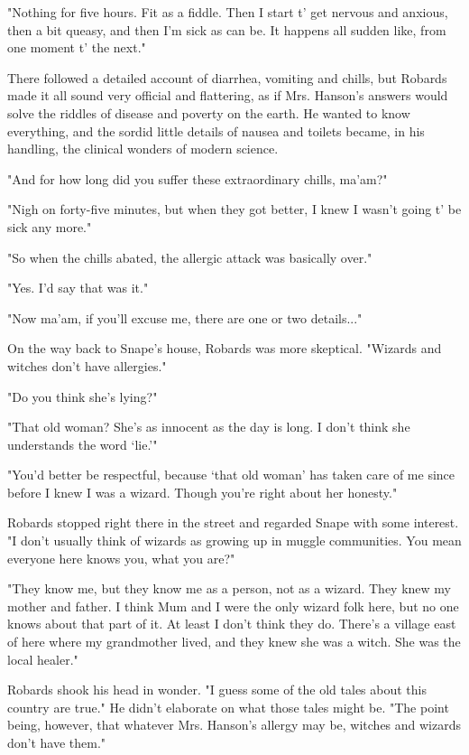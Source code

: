\documentclass[a4paper,11pt]{article}
\begin{document}
"Nothing for five hours. Fit as a fiddle. Then I start t' get nervous and anxious, then a bit queasy, and then I'm sick as can be. It happens all sudden like, from one moment t' the next."

There followed a detailed account of diarrhea, vomiting and chills, but Robards made it all sound very official and flattering, as if Mrs. Hanson's answers would solve the riddles of disease and poverty on the earth. He wanted to know everything, and the sordid little details of nausea and toilets became, in his handling, the clinical wonders of modern science.

"And for how long did you suffer these extraordinary chills, ma'am?"

"Nigh on forty-five minutes, but when they got better, I knew I wasn't going t' be sick any more."

"So when the chills abated, the allergic attack was basically over."

"Yes. I'd say that was it."

"Now ma'am, if you'll excuse me, there are one or two details..."

On the way back to Snape's house, Robards was more skeptical. "Wizards and witches don't have allergies."

"Do you think she's lying?"

"That old woman? She's as innocent as the day is long. I don't think she understands the word `lie.'"

"You'd better be respectful, because `that old woman' has taken care of me since before I knew I was a wizard. Though you're right about her honesty."

Robards stopped right there in the street and regarded Snape with some interest. "I don't usually think of wizards as growing up in muggle communities. You mean everyone here knows you, what you are?"

"They know me, but they know me as a person, not as a wizard. They knew my mother and father. I think Mum and I were the only wizard folk here, but no one knows about that part of it. At least I don't think they do. There's a village east of here where my grandmother lived, and they knew she was a witch. She was the local healer."

Robards shook his head in wonder. "I guess some of the old tales about this country are true." He didn't elaborate on what those tales might be. "The point being, however, that whatever Mrs. Hanson's allergy may be, witches and wizards don't have them."
\end{document}
